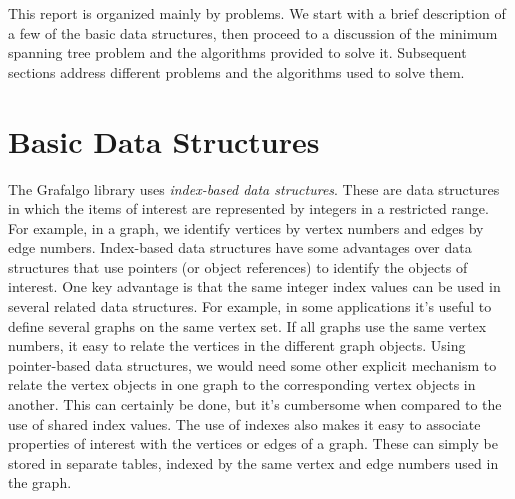 \documentclass[11pt]{article}
\begin{document}
This report is organized mainly by problems. We start with a brief description of
a few of the basic data structures, then proceed to a discussion of the minimum spanning
tree problem and the algorithms provided to solve it.
Subsequent sections address different problems and the algorithms
used to solve them.

\section{Basic Data Structures}

The Grafalgo library uses {\sl index-based data structures}.
These are data structures in which the items of interest are represented by integers in
a restricted range. For example, in a graph, we identify vertices by vertex numbers and
edges by edge numbers. Index-based data structures have some advantages over
data structures that use pointers (or object references) to identify the objects of interest.
One key advantage is that the same integer index values can be used in several related
data structures. For example, in some applications it's useful to define several graphs on
the same vertex set. If all graphs use the same vertex numbers, it easy to relate the vertices
in the different graph objects. Using pointer-based data structures, we would need some other explicit
mechanism to relate the vertex objects in one graph to the corresponding vertex objects in another.
This can certainly be done, but it's cumbersome when compared to the use of shared index values.
The use of indexes also makes it easy to associate properties of interest with the vertices
or edges of a graph. These can simply be stored in separate tables, indexed by the
same vertex and edge numbers used in the graph.
\end{document}
